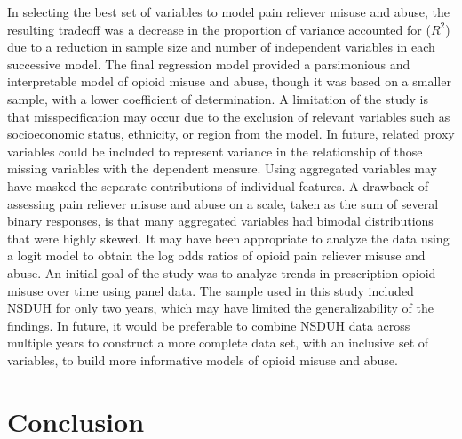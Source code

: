 \documentclass[sigconf]{acmart}
\begin{document}
In selecting the best set of variables to model pain reliever misuse and abuse, 
the resulting tradeoff was a decrease in the proportion of variance accounted
for ($R^2$) due to a reduction in sample size and number of independent 
variables in each successive model. The final regression model provided a 
parsimonious and interpretable model of opioid misuse and abuse, though it 
was based on a smaller sample, with a lower coefficient of determination. A 
limitation of the study is that misspecification may occur due to the exclusion 
of relevant variables such as socioeconomic status, ethnicity, or region
from the model. In future, related proxy variables could be included to 
represent variance in the relationship of those missing variables with the 
dependent measure. Using aggregated variables may have masked the separate 
contributions of individual features. A drawback of assessing pain reliever 
misuse and abuse on a scale, taken as the sum of several binary responses, 
is that many aggregated variables had bimodal distributions that were highly 
skewed.  It may have been appropriate to analyze the data using a logit model 
to obtain the log odds ratios of opioid pain reliever misuse and abuse. An 
initial goal of the study was to analyze trends in prescription opioid misuse 
over time using panel data. The sample used in this study included NSDUH for 
only two years, which may have limited the generalizability of the findings. 
In future, it would be preferable to combine NSDUH data across multiple years 
to construct a more complete data set, with an inclusive set of variables, 
to build more informative models of opioid misuse and abuse.

\section{Conclusion}
\end{document}
